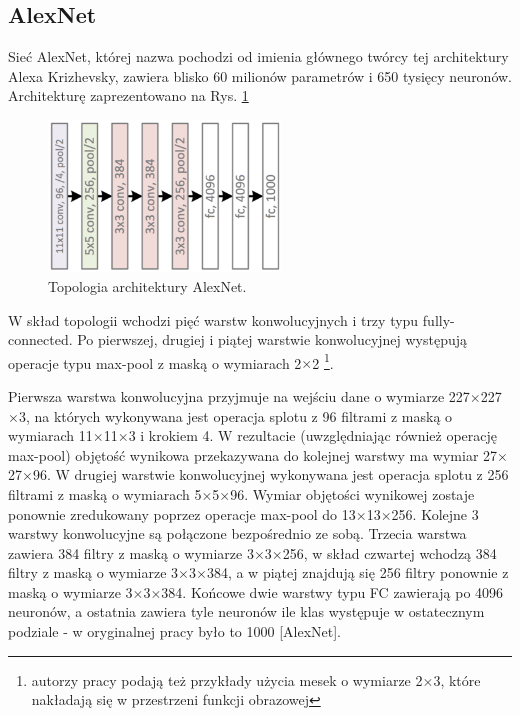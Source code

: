 \subsection{AlexNet}
\label{AlexNet}
Sieć AlexNet, której nazwa pochodzi od imienia głównego twórcy tej architektury Alexa Krizhevsky, zawiera blisko 60 milionów parametrów i 650 tysięcy neuronów. Architekturę zaprezentowano na Rys. \ref{AlexNetTopology}
\begin{figure}[h!]
	\centering
	\includegraphics[width=0.55\textwidth]{figures/AlexNet.png}
	\caption{Topologia architektury AlexNet.}
	\label{AlexNetTopology}
\end{figure}

W skład topologii wchodzi pięć warstw konwolucyjnych i trzy typu fully-connected. Po pierwszej, drugiej i piątej warstwie konwolucyjnej występują operacje typu max-pool z maską o wymiarach 2$\times$2 \footnote{autorzy pracy podają też przykłady użycia mesek o wymiarze 2$\times$3, które nakładają się w przestrzeni funkcji obrazowej}. 

Pierwsza warstwa konwolucyjna przyjmuje na wejściu dane o wymiarze 227$\times$227$\times$3, na których wykonywana jest operacja splotu z 96 filtrami z maską o wymiarach 11$\times$11$\times$3 i krokiem 4. W rezultacie (uwzględniając również operację max-pool) objętość wynikowa przekazywana do kolejnej warstwy ma wymiar 27$\times$27$\times$96. W drugiej warstwie konwolucyjnej wykonywana jest operacja splotu z 256 filtrami z maską o wymiarach 5$\times$5$\times$96. Wymiar objętości wynikowej zostaje ponownie zredukowany poprzez operacje max-pool do 13$\times$13$\times$256. Kolejne 3 warstwy konwolucyjne są połączone bezpośrednio ze sobą. Trzecia warstwa zawiera 384 filtry z maską o wymiarze 3$\times$3$\times$256, w skład czwartej wchodzą 384 filtry z maską o wymiarze 3$\times$3$\times$384, a w piątej znajdują się 256 filtry ponownie z maską o wymiarze 3$\times$3$\times$384. Końcowe dwie warstwy typu FC zawierają po 4096 neuronów, a ostatnia zawiera tyle neuronów ile klas występuje w ostatecznym podziale - w oryginalnej pracy było to 1000 [AlexNet].

